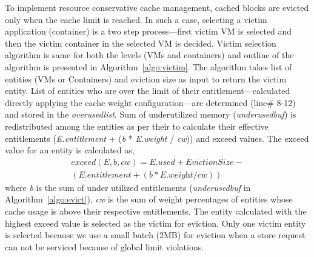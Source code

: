 %
To implement resource conservative cache management,
cached blocks are evicted only when the \dd{} cache limit is reached.
%
In such a case, selecting a victim application (container) is a two step process---first victim
VM is selected and then the victim container in the selected VM is 
decided.
%
Victim selection algorithm is same for both the levels (VMs and containers) and outline of 
the algorithm is presented in Algorithm~\ref{algo:victim}.
% 
The algorithm takes list of entities (VMs or Containers) and eviction size 
as input to return the victim entity.
%
List of entities who are over the limit of their entitlement---calculated directly
applying the \dd{} cache weight configuration---are determined (line\# 8-12) and
stored in the \textit{overusedlist}.  
%
Sum of underutilized memory (\textit{underusedbuf}) is redistributed among
the entities as per their  to calculate their effective entitlements 
(\textit{E.entitlement} + (\textit{b} * \textit{E.weight} / \textit{cw}))
and exceed values.
%
The exceed value for an entity is calculated as,
\begin{equation}
\begin{aligned}
exceed(\textit{E}, \textit{b}, \textit{cw}) = \textit{E.used} + \textit{EvictionSize} - \\
                                              (\textit{E.entitlement} + (\textit{b} * \textit{E.weight} / \textit{cw}))
\end{aligned}
\end{equation}
where \textit{b} is the sum of under utilized entitlements (\textit{underusedbuf} in
Algorithm~\ref{algo:evict}), \textit{cw} is the sum of weight percentages of entities whose cache
usage is above their respective entitlements.
%
The entity calculated with the highest exceed value is selected as the 
victim for eviction.
%
Only one victim entity is selected because 
we use a small batch (2MB) for eviction when a store request can not be
serviced because of global limit violations.
